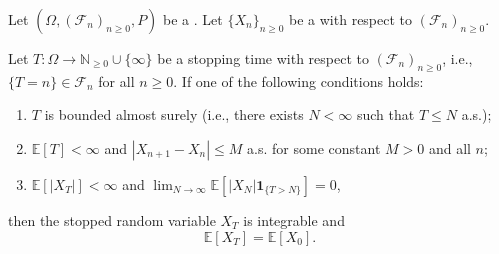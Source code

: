 \begin{theorem} \label{theorem:optional_stopping_theorem_for_martingales}
Let $(\Omega, (\mathcal{F}_n)_{n \geq 0}, P)$ be a . Let $\{X_n\}_{n \geq 0}$ be a  with respect to $(\mathcal{F}_n)_{n \geq 0}$.

Let $T: \Omega \to \mathbb{N}_{\geq 0} \cup \{\infty\}$ be a stopping time with respect to $(\mathcal{F}_n)_{n \geq 0}$, i.e., $\{T = n\} \in \mathcal{F}_n$ for all $n \geq 0$. If one of the following conditions holds:

\begin{enumerate}
    \item $T$ is bounded almost surely (i.e., there exists $N < \infty$ such that $T \leq N$ a.s.);
    \item $\mathbb{E}[T] < \infty$ and $|X_{n+1} - X_n| \leq M$ a.s. for some constant $M > 0$ and all $n$;
    \item $\mathbb{E}[|X_T|] < \infty$ and $\lim_{N \to \infty} \mathbb{E}[|X_N| \mathbf{1}_{\{T > N\}}] = 0$,
\end{enumerate}

then the stopped random variable $X_T$ is integrable and
$$\mathbb{E}[X_T] = \mathbb{E}[X_0].$$
\end{theorem}